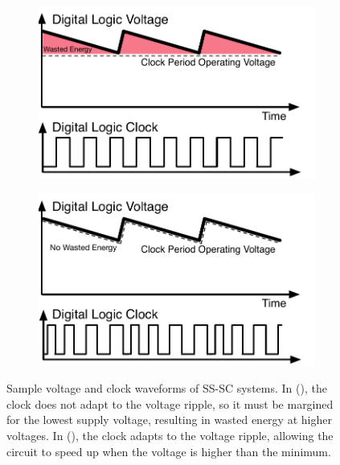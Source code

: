 \documentclass[graybox]{svmult}
\begin{document}
\begin{figure}
  \centering
  \begin{subfigure}[t]{0.6\textwidth}
  \centering
  \includegraphics[width=\textwidth]{3-ripple-clocking-a}
  \caption{}
  \label{fig:3-ripple-clocking-a}
  \end{subfigure}
  \par\bigskip
  \begin{subfigure}[t]{0.6\textwidth}
  \centering
  \includegraphics[width=\textwidth]{3-ripple-clocking-b}
  \caption{}
  \label{fig:3-ripple-clocking-b}
  \end{subfigure}
  \caption{Sample voltage and clock waveforms of SS-SC systems.  In (), the clock does not adapt to the voltage ripple, so it must be margined for the lowest supply voltage, resulting in wasted energy at higher voltages.  In (), the clock adapts to the voltage ripple, allowing the circuit to speed up when the voltage is higher than the minimum.}
  \label{fig:3-ripple-clocking}
\end{figure}
 
\end{document}
